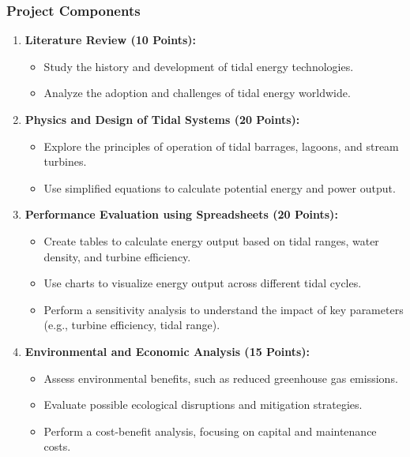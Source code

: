 \documentclass[11pt]{article}
\begin{document}
\subsubsection*{Project Components}
\begin{enumerate}
    \item \textbf{Literature Review (10 Points):}
    \begin{itemize}
        \item Study the history and development of tidal energy technologies.
        \item Analyze the adoption and challenges of tidal energy worldwide.
    \end{itemize}

    \item \textbf{Physics and Design of Tidal Systems (20 Points):}
    \begin{itemize}
        \item Explore the principles of operation of tidal barrages, lagoons, and stream turbines.
        \item Use simplified equations to calculate potential energy and power output.
    \end{itemize}

    \item \textbf{Performance Evaluation using Spreadsheets (20 Points):}
    \begin{itemize}
        \item Create tables to calculate energy output based on tidal ranges, water density, and turbine efficiency.
        \item Use charts to visualize energy output across different tidal cycles.
        \item Perform a sensitivity analysis to understand the impact of key parameters (e.g., turbine efficiency, tidal range).
    \end{itemize}

    \item \textbf{Environmental and Economic Analysis (15 Points):}
    \begin{itemize}
        \item Assess environmental benefits, such as reduced greenhouse gas emissions.
        \item Evaluate possible ecological disruptions and mitigation strategies.
        \item Perform a cost-benefit analysis, focusing on capital and maintenance costs.
    \end{itemize}


\end{enumerate}
\end{document}
